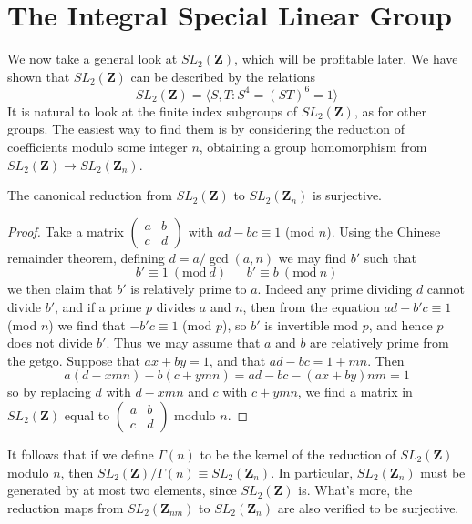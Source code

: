\section{The Integral Special Linear Group}

We now take a general look at $SL_2(\mathbf{Z})$, which will be profitable later. We have shown that $SL_2(\mathbf{Z})$ can be described by the relations
%
\[ SL_2(\mathbf{Z}) = \langle S, T : S^4 = (ST)^6 = 1 \rangle \]
%
It is natural to look at the finite index subgroups of $SL_2(\mathbf{Z})$, as for other groups. The easiest way to find them is by considering the reduction of coefficients modulo some integer $n$, obtaining a group homomorphism from $SL_2(\mathbf{Z}) \to SL_2(\mathbf{Z}_n)$.

\begin{theorem}
    The canonical reduction from $SL_2(\mathbf{Z})$ to $SL_2(\mathbf{Z}_n)$ is surjective.
\end{theorem}
\begin{proof}
    Take a matrix $\left( \begin{smallmatrix} a & b \\ c & d \end{smallmatrix} \right)$ with $ad - bc \equiv 1$ (mod $n$). Using the Chinese remainder theorem, defining $d = a/\gcd(a,n)$ we may find $b'$ such that
    \[ b' \equiv 1\ (\text{mod}\ d)\ \ \ \ \ \ \ b' \equiv b\ (\text{mod}\ n) \]
    we then claim that $b'$ is relatively prime to $a$. Indeed any prime dividing $d$ cannot divide $b'$, and if a prime $p$ divides $a$ and $n$, then from the equation $ad - b'c \equiv 1$ (mod $n$) we find that $- b'c \equiv 1$ (mod $p$), so $b'$ is invertible mod $p$, and hence $p$ does not divide $b'$. Thus we may assume that $a$ and $b$ are relatively prime from the getgo. Suppose that $ax + by = 1$, and that $ad - bc = 1 + mn$. Then
    \[ a(d - xmn) - b(c + ymn) = ad - bc - (ax + by)nm = 1 \]
    so by replacing $d$ with $d - xmn$ and $c$ with $c + ymn$, we find a matrix in $SL_2(\mathbf{Z})$ equal to $\left( \begin{smallmatrix} a & b \\ c & d \end{smallmatrix} \right)$ modulo $n$.
\end{proof}

It follows that if we define $\Gamma(n)$ to be the kernel of the reduction of $SL_2(\mathbf{Z})$ modulo $n$, then $SL_2(\mathbf{Z})/\Gamma(n) \equiv SL_2(\mathbf{Z}_n)$. In particular, $SL_2(\mathbf{Z}_n)$ must be generated by at most two elements, since $SL_2(\mathbf{Z})$ is. What's more, the reduction maps from $SL_2(\mathbf{Z}_{nm})$ to $SL_2(\mathbf{Z}_n)$ are also verified to be surjective.

